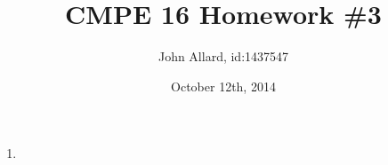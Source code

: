 \documentclass[a4paper,11pt]{article}
\title{ CMPE 16 Homework \#3}
\author{John Allard, id:1437547}
\date{October 12th, 2014}
\begin{document}
\maketitle


\begin{enumerate}


\item

\end{enumerate}
\end{document}
